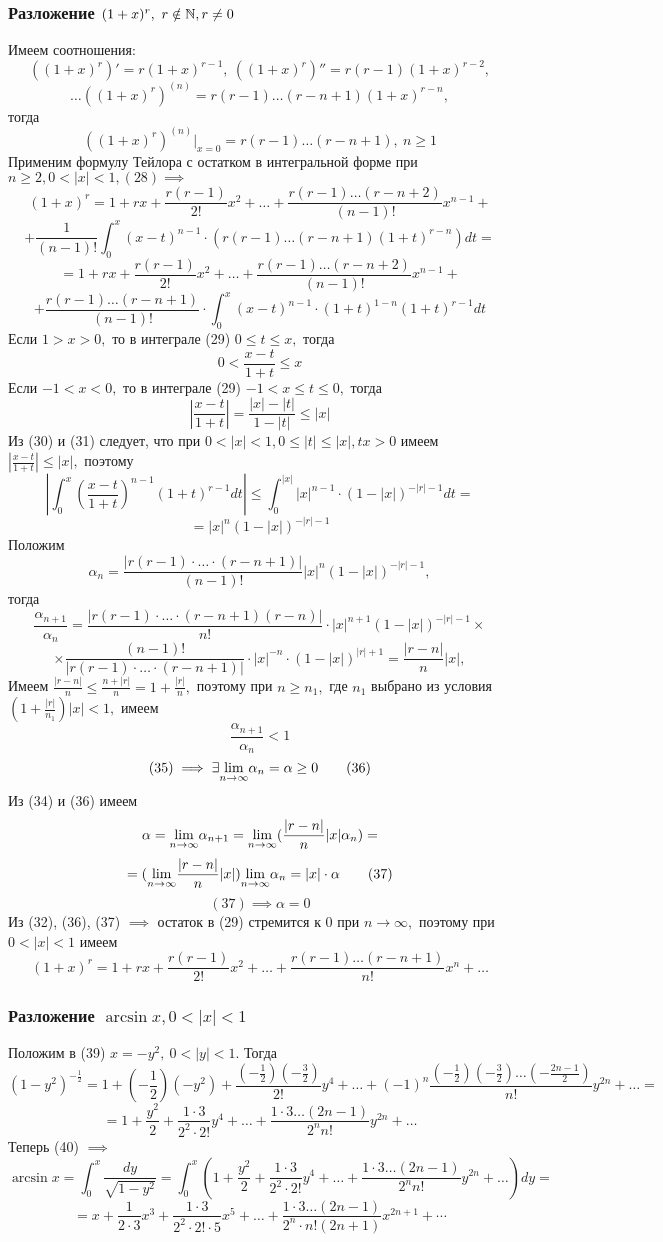 \documentclass[main]{subfiles}
\begin{document}
 \subsubsection{Разложение \boldmath$(1+x)^r,\ r\notin\mathbb{N}, r \ne 0$}
 Имеем соотношения: 
 \[ ((1+x)^r)'=r(1+x)^{r-1},\ ((1+x)^r)''=r(r-1)(1+x)^{r-2},\]
 \[ \dots ((1+x)^r)^{(n)}=r(r-1)\dots(r-n+1)(1+x)^{r-n}, \]
 тогда \[ ((1+x)^r)^{(n)}|_{x=0}=r(r-1)\dots(r-n+1),\ n\geq 1\tag{28} \]
Применим формулу Тейлора с остатком в интегральной форме при $n\geq 2, 0<|x|<1, (28)\implies$
 \[ (1+x)^r=1+rx+\frac{r(r-1)}{2!}x^2+\dots+\frac{r(r-1)\dots(r-n+2)}{(n-1)!}x^{n-1}+ \]
 \[ +\frac{1}{(n-1)!}\int_0^x (x-t)^{n-1}\cdot(r(r-1)\dots(r-n+1)(1+t)^{r-n})dt=\]
 \[ =1+rx+\frac{r(r-1)}{2!}x^2+\dots+\frac{r(r-1)\dots(r-n+2)}{(n-1)!}x^{n-1}+\]\[+\frac{r(r-1)\dots(r-n+1)}{(n-1)!}\cdot \int_0^x(x-t)^{n-1}\cdot(1+t)^{1-n}(1+t)^{r-1}dt\tag{29} \]
Если $1>x>0,$ то в интеграле (29) $0\leq t\leq x,$ тогда \[ 0<\frac{x-t}{1+t}\leq x\tag{30} \] 
 Если $-1<x<0,$ то в интеграле (29) $-1<x\leq t\leq 0,$ тогда
 \[ |\frac{x-t}{1+t}|=\frac{|x|-|t|}{1-|t|}\leq |x|\tag{31} \]
 Из (30) и (31) следует, что при $0<|x|<1, 0\leq |t|\leq |x|, tx>0$ имеем $|\frac{x-t}{1+t}|\leq|x|,$ поэтому
\[ |\int_0^x(\frac{x-t}{1+t})^{n-1}(1+t)^{r-1}dt|\leq \int_0^{|x|}|x|^{n-1}\cdot(1-|x|)^{-|r|-1}dt= \]
 \[ = |x|^n (1-|x|)^{-|r|-1}\tag{32} \]\newpage
 Положим \[ \alpha_n=\frac{|r(r-1)\cdot\dots\cdot(r-n+1)|}{(n-1)!}|x|^n(1-|x|)^{-|r|-1},\tag{33}\]
 тогда \[ \frac{\alpha_{n+1}}{\alpha_n}=\frac{|r(r-1)\cdot\dots\cdot(r-n+1)(r-n)|}{n!}\cdot|x|^{n+1}(1-|x|)^{-|r|-1}\times \]\[ \times \frac{(n-1)!}{|r(r-1)\cdot\dots\cdot(r-n+1)|}\cdot|x|^{-n}\cdot(1-|x|)^{|r|+1}=\frac{|r-n|}{n}|x|,\tag{34}\]
 Имеем $\frac{|r-n|}{n}\leq \frac{n+|r|}{n}=1+\frac{|r|}{n},$ поэтому при $n\geq n_1,$ где $n_1$ выбрано из условия $(1+\frac{|r|}{n_1})|x|<1,$ имеем
\[ \frac{\alpha_{n+1}}{\alpha_n}<1\tag{35} \]
\[(35) \implies \exists\underset{n\to\infty}{\lim} \alpha_n=\alpha\geq 0\tag{36}\]
 Из (34) и (36) имеем \[ \alpha=\underset{n\to\infty}{\lim}\alpha_{n+1}=\underset{n\to\infty}{\lim} (\frac{|r-n|}{n}|x|\alpha_n)=\]
 \[ =(\underset{n\to\infty}{\lim} \frac{|r-n|}{n}|x|)\underset{n\to\infty}{\lim}\alpha_n=|x|\cdot\alpha\tag{37} \]
 \[ (37) \implies \alpha=0\tag{38}\]
 Из (32), (36), (37) $\implies$ остаток в (29) стремится к 0 при $n\to\infty,$ поэтому при $0<|x|<1$ имеем
 \[ (1+x)^r=1+rx+\frac{r(r-1)}{2!}x^2+\dots+\frac{r(r-1)\dots(r-n+1)}{n!}x^n+\dots\tag{39}\]\newpage
 \subsubsection{Разложение $\arcsin x, 0<|x|<1$}
 Положим в (39) $x=-y^2,\ 0<|y|<1.$ Тогда \[ (1-y^2)^{-\frac{1}{2}}=1+(-\frac{1}{2})(-y^2)+\frac{(-\frac{1}{2})(-\frac{3}{2})}{2!}y^4+\dots+(-1)^n\frac{(-\frac{1}{2})(-\frac{3}{2})\dots(-\frac{2n-1}{2})}{n!}y^{2n}+\dots=\]
 \[=1+\frac{y^2}{2}+\frac{1\cdot 3}{2^2\cdot 2!}y^4+\dots+\frac{1\cdot 3\dots(2n-1)}{2^n n!}y^{2n}+\dots\tag{40} \]
 Теперь (40) $\implies$
 \[ \arcsin x=\int_0^x\frac{dy}{\sqrt{1-y^2}}=\int_0^x(1+\frac{y^2}{2}+\frac{1\cdot 3}{2^2\cdot 2!}y^4+\dots+\frac{1\cdot 3\dots(2n-1)}{2^n n!}y^{2n}+\dots)dy= \]
 \[ =x+\frac{1}{2\cdot 3}x^3+\frac{1\cdot 3}{2^2\cdot 2!\cdot 5}x^5+\dots+\frac{1\cdot 3\dots(2n-1)}{2^n\cdot n!(2n+1)}x^{2n+1}+\cdots\]
\end{document}
